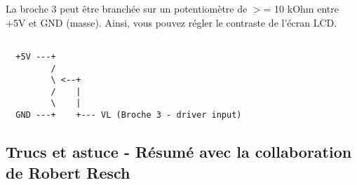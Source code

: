   La broche 3 peut être branchée sur un potentiomètre de $>$= 10 kOhm entre +5V
  et GND (masse). Ainsi, vous pouvez régler le contraste de l'écran LCD.

\begin{example}
\begin{verbatim}

  +5V ---+
         /
         \ <--+
         /    |
         \    |
  GND ---+    +--- VL (Broche 3 - driver input)
\end{verbatim}
\end{example}


\subsection{Trucs et astuce - Résumé avec la collaboration de Robert Resch}

